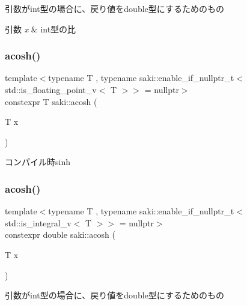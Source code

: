 引数がint型の場合に、戻り値をdouble型にするためのもの 


\begin{DoxyParams}{引数}
{\em x} & int型の比 \\
\hline
\end{DoxyParams}
\mbox{\label{namespacesaki_ac1c85a4defc25dc9eb6b380f29946f83}} 
\subsubsection{\texorpdfstring{acosh()}{acosh()}\hspace{0.1cm}{\footnotesize\ttfamily [1/2]}}
{\footnotesize\ttfamily template$<$typename T , typename saki\+::enable\+\_\+if\+\_\+nullptr\+\_\+t$<$ std\+::is\+\_\+floating\+\_\+point\+\_\+v$<$ T $>$$>$  = nullptr$>$ \\
constexpr T saki\+::acosh (\begin{DoxyParamCaption}\item[{T}]{x }\end{DoxyParamCaption})}



コンパイル時sinh 

\mbox{\label{namespacesaki_a8d3766d425082661e966b04504b90002}} 
\subsubsection{\texorpdfstring{acosh()}{acosh()}\hspace{0.1cm}{\footnotesize\ttfamily [2/2]}}
{\footnotesize\ttfamily template$<$typename T , typename saki\+::enable\+\_\+if\+\_\+nullptr\+\_\+t$<$ std\+::is\+\_\+integral\+\_\+v$<$ T $>$$>$  = nullptr$>$ \\
constexpr double saki\+::acosh (\begin{DoxyParamCaption}\item[{T}]{x }\end{DoxyParamCaption})}



引数がint型の場合に、戻り値をdouble型にするためのもの 

\mbox{\label{namespacesaki_a63f2b40515cd62b037dade64aa8465db}} 
